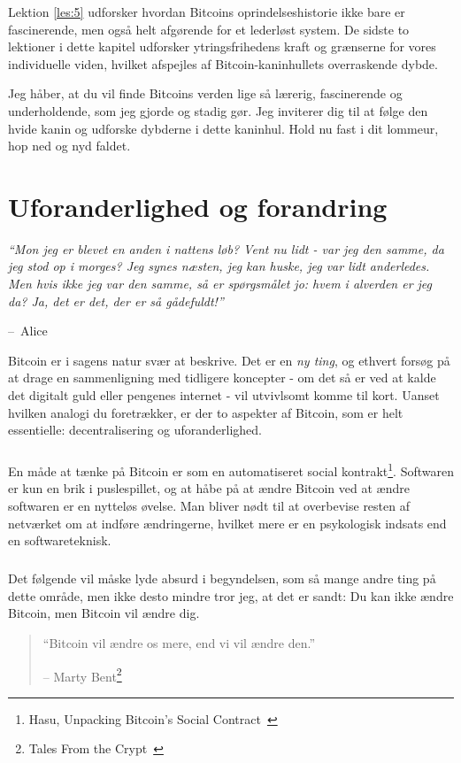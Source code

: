 \documentclass[paper=6in:9in,pagesize=pdftex,headinclude=on,footinclude=on,12pt]{scrbook}
\makeatletter
\newenvironment{chapquote}[2][4em]{\setlength{\@tempdima}{#1}%
   \def\chapquote@author{#2}%
   \parshape 1 \@tempdima \dimexpr\textwidth-2\@tempdima\relax%
   \itshape}{\par\normalfont\hfill--\ \chapquote@author\hspace*{\@tempdima}\par\bigskip}
\makeatother
\begin{document}
Lektion \ref{les:5} udforsker hvordan Bitcoins oprindelseshistorie ikke bare er fascinerende, men også helt afgørende for et lederløst system. De sidste to lektioner i dette kapitel udforsker ytringsfrihedens kraft og grænserne for vores individuelle viden, hvilket afspejles af Bitcoin-kaninhullets overraskende dybde.

Jeg håber, at du vil finde Bitcoins verden lige så lærerig, fascinerende og underholdende, som jeg gjorde og stadig gør. Jeg inviterer dig til at følge den hvide kanin og udforske dybderne i dette kaninhul. Hold nu fast i dit lommeur, hop ned og nyd faldet. 
\chapter{Uforanderlighed og forandring}
\label{les:1}

\begin{chapquote}{Alice} \enquote{Mon jeg er blevet en anden i nattens løb? Vent nu lidt - var jeg den samme, da jeg stod op i morges? Jeg synes næsten, jeg kan huske, jeg var lidt anderledes. Men hvis ikke jeg var den samme, så er spørgsmålet jo: hvem i alverden er jeg da? Ja, det er det, der er så gådefuldt!} \end{chapquote}

Bitcoin er i sagens natur svær at beskrive. Det er en \textit{ny ting}, og ethvert forsøg på at drage en sammenligning med tidligere koncepter - om det så er ved at kalde det digitalt guld eller pengenes internet - vil utvivlsomt komme til kort. Uanset hvilken analogi du foretrækker, er der to aspekter af Bitcoin, som er helt essentielle: decentralisering og uforanderlighed.\paragraph{} En måde at tænke på Bitcoin er som en automatiseret social kontrakt\footnote{Hasu, Unpacking Bitcoin's Social Contract~\cite{social-contract}}. Softwaren er kun en brik i puslespillet, og at håbe på at ændre Bitcoin ved at ændre softwaren er en nytteløs øvelse. Man bliver nødt til at overbevise resten af netværket om at indføre ændringerne, hvilket mere er en psykologisk indsats end en softwareteknisk.\paragraph{} Det følgende vil måske lyde absurd i begyndelsen, som så mange andre ting på dette område, men ikke desto mindre tror jeg, at det er sandt: Du kan ikke ændre Bitcoin, men Bitcoin vil ændre dig.\begin{quotation}\begin{samepage} \enquote{Bitcoin vil ændre os mere, end vi vil ændre den.} \begin{flushright} -- Marty Bent\footnote{Tales From the Crypt~\cite{tftc21}}
\end{flushright}\end{samepage}\end{quotation}
\end{document}
